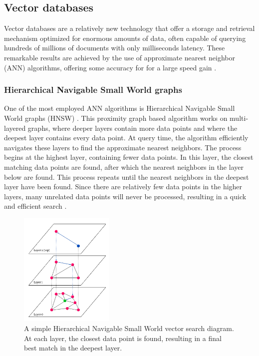 \documentclass[twoside]{uva-inf-bachelor-thesis}
\begin{document}
\subsection{Vector databases}
Vector databases are a relatively new technology that offer a storage and retrieval mechanism optimized for enormous amounts of data, often capable of querying hundreds of millions of documents with only milliseconds latency. 
These remarkable results are achieved by the use of approximate nearest neighbor (ANN) algorithms, offering some accuracy for for a large speed gain \cite{han2023comprehensive}. 

\subsubsection{Hierarchical Navigable Small World graphs}
One of the most employed ANN algorithms is Hierarchical Navigable Small World graphs (HNSW) \cite{malkov2018efficient}. 
This proximity graph based algorithm works on multi-layered graphs, where deeper layers contain more data points and where the deepest layer contains every data point. At query time, the algorithm efficiently navigates these layers to find the approximate nearest neighbors. The process begins at the highest layer, containing fewer data points. In this layer, the closest matching data points are found, after which the nearest neighbors in the layer below are found. This process repeats until the nearest neighbors in the deepest layer have been found. Since there are relatively few data points in the higher layers, many unrelated data points will never be processed, resulting in a quick and efficient search \cite{Malkov2014Approximate}.

\begin{figure}[h]
    \centering
    \includegraphics[width=0.4\textwidth]{images/hnsw2.png}
    \caption{A simple Hierarchical Navigable Small World vector search diagram. At each layer, the closest data point is found, resulting in a final best match in the deepest layer.}
    \label{fig:hnsw}
\end{figure}
\end{document}
